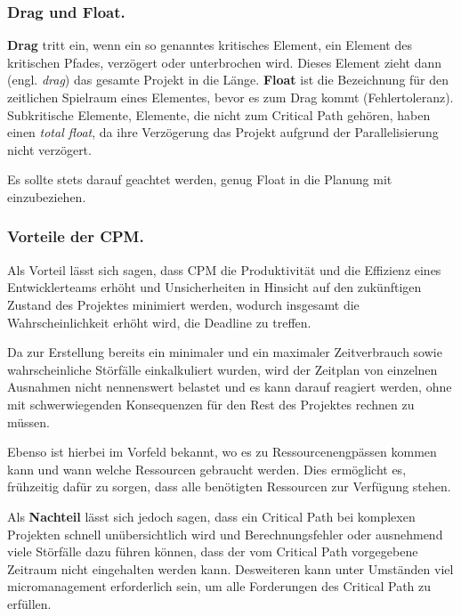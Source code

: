 		\subsubsection{Drag und Float.}
			\label{sssec:drag}
			\textbf{Drag} tritt ein, wenn ein so genanntes kritisches Element, ein Element des kritischen Pfades, verzögert oder unterbrochen wird.
			Dieses Element zieht dann (engl. \textit{drag}) das gesamte Projekt in die Länge.
			\textbf{Float} ist die Bezeichnung für den zeitlichen Spielraum eines Elementes, bevor es zum Drag kommt (Fehlertoleranz).
			Subkritische Elemente, Elemente, die nicht zum Critical Path gehören, haben einen \textit{total float}, da ihre Verzögerung das Projekt aufgrund der Parallelisierung nicht verzögert.
			
			Es sollte stets darauf geachtet werden, genug Float in die Planung mit einzubeziehen.
			
		\subsubsection{Vorteile der CPM.}
			\label{sssec:cpm-pro}
			Als Vorteil lässt sich sagen, dass CPM die Produktivität und die Effizienz eines Entwicklerteams erhöht und Unsicherheiten in Hinsicht auf den zukünftigen Zustand des Projektes minimiert werden, wodurch insgesamt die Wahrscheinlichkeit erhöht wird, die Deadline zu treffen.
			
			Da zur Erstellung bereits ein minimaler und ein maximaler Zeitverbrauch sowie wahrscheinliche Störfälle einkalkuliert wurden, wird der Zeitplan von einzelnen Ausnahmen nicht nennenswert belastet und es kann darauf reagiert werden, ohne mit schwerwiegenden Konsequenzen für den Rest des Projektes rechnen zu müssen.
			
			Ebenso ist hierbei im Vorfeld bekannt, wo es zu Ressourcenengpässen kommen kann und wann welche Ressourcen gebraucht werden. Dies ermöglicht es, frühzeitig dafür zu sorgen, dass alle benötigten Ressourcen zur Verfügung stehen.
			
			Als \textbf{Nachteil} lässt sich jedoch sagen, dass ein Critical Path bei komplexen Projekten schnell unübersichtlich wird und Berechnungsfehler oder ausnehmend viele Störfälle dazu führen können, dass der vom Critical Path vorgegebene Zeitraum nicht eingehalten werden kann.
			Desweiteren kann unter Umständen viel micromanagement erforderlich sein, um alle Forderungen des Critical Path zu erfüllen.
			
			
